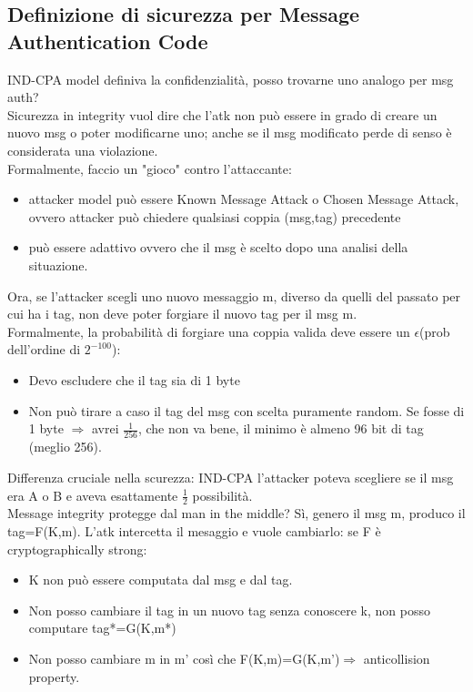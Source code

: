 \documentclass[16px]{article}
\begin{document}
\subsection{Definizione di sicurezza per Message Authentication Code}
IND-CPA model definiva la confidenzialità, posso trovarne uno analogo per msg auth?\\
Sicurezza in integrity vuol dire che l'atk non può essere in grado di creare un nuovo msg o poter modificarne uno; anche se il msg modificato perde di senso è considerata una violazione.\\
Formalmente, faccio un "gioco" contro l'attaccante:
\begin{itemize} 
\item attacker model può essere Known Message Attack o Chosen Message Attack, ovvero attacker può chiedere qualsiasi coppia (msg,tag) precedente
\item può essere adattivo ovvero che il msg è scelto dopo una analisi della situazione.
\end{itemize}
Ora, se l'attacker scegli uno nuovo messaggio m, diverso da quelli del passato per cui ha i tag, non deve poter forgiare il nuovo tag per il msg m.\\
Formalmente, la probabilità di forgiare una coppia valida deve essere un $\epsilon$(prob dell'ordine di $2^{-100}$):
\begin{itemize} 
\item Devo escludere che il tag sia di 1 byte
\item Non può tirare a caso il tag del msg con scelta puramente random.
Se fosse di 1 byte $\Rightarrow$ avrei $\frac{1}{256}$, che non va bene, il minimo è almeno 96 bit di tag (meglio 256).
\end{itemize}
Differenza cruciale nella scurezza: IND-CPA l'attacker poteva scegliere se il msg era A o B e aveva esattamente $\frac{1}{2}$ possibilità.\\
Message integrity protegge dal man in the middle? Sì, genero il msg m, produco il tag=F(K,m). L'atk intercetta il mesaggio e vuole cambiarlo: se F è cryptographically strong:\\
\begin{itemize}
\item K non può essere computata dal msg e dal tag.
\item Non posso cambiare il tag in un nuovo tag senza conoscere k, non posso computare tag*=G(K,m*)
\item Non posso cambiare m in m' così che F(K,m)=G(K,m')$\Rightarrow$ anticollision property.
\end{itemize}
\end{document}
